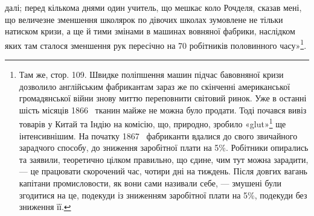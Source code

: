далі; перед кількома днями один учитель, що мешкає коло Рочделя,
сказав мені, що величезне зменшення школярок по дівочих школах
зумовлене не тільки натиском кризи, а ще й тими змінами
в машинах вовняної фабрики, наслідком яких там сталося зменшення
рук пересічно на 70 робітників половинного часу»\footnote{
Там же, стор. 109. Швидке поліпшення машин підчас бавовняної
кризи дозволило англійським фабрикантам зараз же по скінченні американської
громадянської війни знову миттю переповнити світовий ринок.
Уже в останні шість місяців 1866~ тканин майже не можна було продати.
Тоді почався вивіз товарів у Китай та Індію на комісію, що, природно,
зробило «glut»\footnote*{
пересичення ринку. 
} ще інтенсивнішим. На початку 1867~ фабриканти вдалися
до свого звичайного зарадчого способу, до зниження заробітної
плати на 5\%. Робітники опирались та заявили, теоретично цілком правильно,
що єдине, чим тут можна зарадити, — це працювати скорочений
час, чотири дні на тиждень. Після довгих вагань капітани промисловости,
як вони сами називали себе, — змушені були згодитися на це, подекуди
із зниженням заробітної плати на 5\%, подекуди без зниження її.
}.
